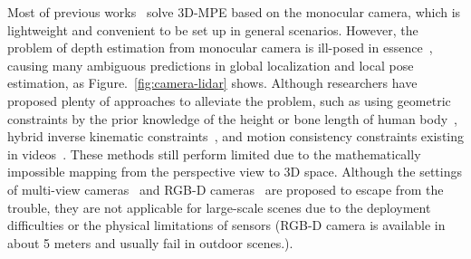 \documentclass[letterpaper]{article} %
\begin{document}
Most of previous works~\cite{veges2019absolute,wang2020hmor} solve 3D-MPE based on the monocular camera, which is lightweight and convenient to be set up in general scenarios. However, the problem of depth estimation from monocular camera is ill-posed in essence~\cite{mallot1991inverse}, causing many ambiguous predictions in global localization and local pose estimation, as Figure.~\ref{fig:camera-lidar} shows. Although researchers have proposed plenty of approaches to alleviate the problem, such as using geometric constraints by the prior knowledge of the height or bone length of human body~\cite{zhang2022mutual}, hybrid inverse kinematic constraints~\cite{sun2021monocular,li2021hybrik}, and motion consistency constraints existing in videos~\cite{temporal-zhang2022mixste}. These methods still perform limited due to the mathematically impossible mapping from the perspective view to 3D space. Although the settings of multi-view cameras~\cite{dong2019fast,zhang2021direct} and RGB-D cameras~\cite{zimmermann20183d} are proposed to escape from the trouble, they are not applicable for large-scale scenes due to the deployment difficulties or the physical limitations of sensors (RGB-D camera is available in about 5 meters and usually fail in outdoor scenes.). 
\end{document}
